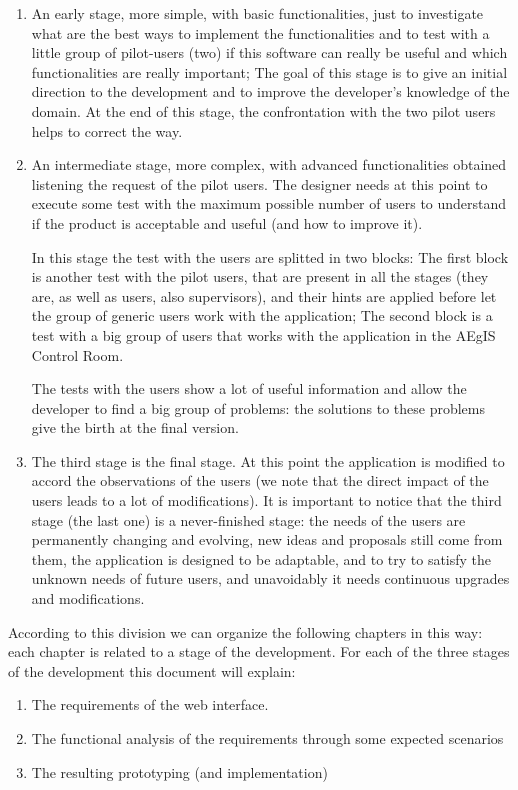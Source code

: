 \begin{enumerate}

\item An early stage, more simple, with basic functionalities, just to investigate what are the best ways to implement the functionalities and to test with a little group of pilot-users (two) if this software can really be useful and which functionalities are really important; The goal of this stage is to give an initial direction to the development and to improve the developer's knowledge of the domain. At the end of this stage, the confrontation with the two pilot users helps to correct the way.

\item An intermediate stage, more complex, with advanced functionalities obtained listening the request of the pilot users.  
The designer needs at this point to execute some test with the maximum possible number of users to understand if the product is acceptable and useful (and how to improve it). 

In this stage the test with the users are splitted in two blocks:  
The first block is another test with the pilot users, that are present in all the stages (they are, as well as users, also supervisors), and their hints are applied before let the group of generic users work with the application;
The second block is a test with a big group of users that works with the application in the AEgIS Control Room.

The tests with the users show a lot of useful information and allow the developer to find a big group of problems: the solutions to these problems give the birth at the final version. 

\item
The third stage is the final stage. At this point the application is modified to accord the observations of the users (we note that the direct impact of the users leads to a lot of modifications). It is important to notice that the third stage (the last one) is a never-finished stage: the needs of the users are permanently changing and evolving, new ideas and proposals still come from them, the application is designed to be adaptable, and to try to satisfy the unknown needs of future users, and unavoidably it needs continuous upgrades and modifications. 

\end{enumerate}

According to this division we can organize the following chapters in this way:
each chapter is related to a stage of the development.
For each of the three stages of the development this document will explain:

\begin {enumerate}

\item
The requirements of the web interface.

\item
The functional analysis of the requirements through some expected scenarios

\item
The resulting prototyping (and implementation)  

\end {enumerate} 

